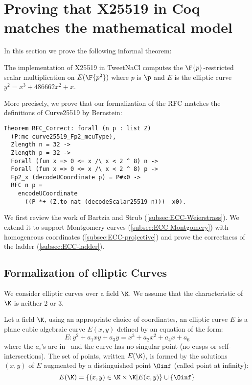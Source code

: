\section{Proving that X25519 in Coq matches the mathematical model}
\label{sec:maths}

In this section we prove the following informal theorem:

\begin{informaltheorem}
The implementation of X25519 in TweetNaCl computes the
$\F{p}$-restricted \xcoord scalar multiplication on $E(\F{p^2})$ where $p$ is $\p$
and $E$ is the elliptic curve $y^2 = x^3 + 486662 x^2 + x$.
\end{informaltheorem}

More precisely, we prove that our formalization of the RFC matches the definitions of Curve25519 by Bernstein:
\begin{lstlisting}[language=Coq]
Theorem RFC_Correct: forall (n p : list Z)
  (P:mc curve25519_Fp2_mcuType),
  Zlength n = 32 ->
  Zlength p = 32 ->
  Forall (fun x => 0 <= x /\ x < 2 ^ 8) n ->
  Forall (fun x => 0 <= x /\ x < 2 ^ 8) p ->
  Fp2_x (decodeUCoordinate p) = P#x0 ->
  RFC n p =
    encodeUCoordinate
      ((P *+ (Z.to_nat (decodeScalar25519 n))) _x0).
\end{lstlisting}

We first review the work of Bartzia and Strub \cite{BartziaS14} (\ref{subsec:ECC-Weierstrass}).
We extend it to support Montgomery curves (\ref{subsec:ECC-Montgomery})
with homogeneous coordinates (\ref{subsec:ECC-projective}) and prove the
correctness of the ladder (\ref{subsec:ECC-ladder}).

\subsection{Formalization of elliptic Curves}
\label{subsec:ECC}

We consider elliptic curves over a field $\K$. We assume that the
characteristic of $\K$ is neither 2 or 3.

\begin{dfn}
Let a field $\K$, using an appropriate choice of coordinates, an elliptic curve $E$
is a plane cubic algebraic curve $E(x,y)$ defined by an equation of the form:
$$E : y^2 + a_1 xy + a_3 y = x^3 + a_2 x^2 + a_4 x + a_6$$
where the $a_i$'s are in \K\ and the curve has no singular point (\ie no cusps
or self-intersections). The set of points, written $E(\K)$, is formed by the
solutions $(x,y)$ of $E$ augmented by a distinguished point $\Oinf$ (called point at infinity):
$$E(\K) = \{(x,y) \in \K \times \K | E(x,y)\} \cup \{\Oinf\}$$
\end{dfn}

